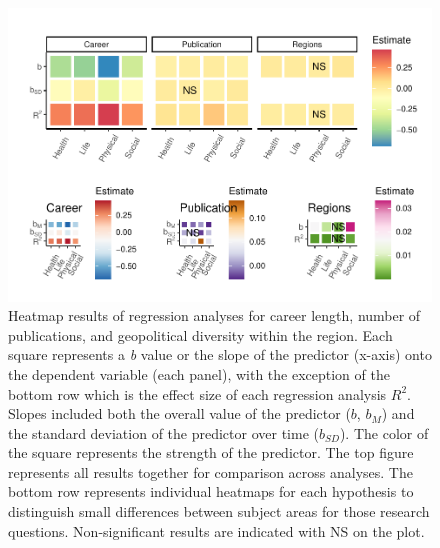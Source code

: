 \documentclass[
  man,mask,floatsintext]{apa7}
\begin{document}
\begin{figure}
\centering
\includegraphics{manuscript_scopus_files/figure-latex/fig-heatmap-1.pdf}
\caption{\label{fig:fig-heatmap}Heatmap results of regression analyses for career length, number of publications, and geopolitical diversity within the region. Each square represents a \emph{b} value or the slope of the predictor (x-axis) onto the dependent variable (each panel), with the exception of the bottom row which is the effect size of each regression analysis \(R^2\). Slopes included both the overall value of the predictor (\(b\), \(b_M\)) and the standard deviation of the predictor over time (\(b_{SD}\)). The color of the square represents the strength of the predictor. The top figure represents all results together for comparison across analyses. The bottom row represents individual heatmaps for each hypothesis to distinguish small differences between subject areas for those research questions. Non-significant results are indicated with NS on the plot.}
\end{figure}
\end{document}
